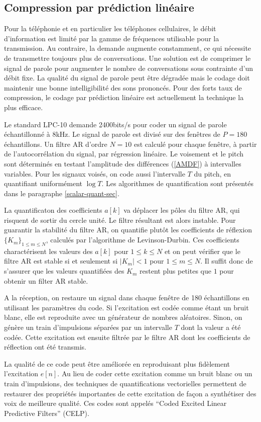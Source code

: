 \subsection{Compression par pr\'ediction lin\'eaire}
\label{compre-LPC}

Pour la t\'el\'ephonie et en particulier les t\'el\'ephones cellulaires,
le d\'ebit d'information est limit\'e par la gamme de fr\'equences
utilisable pour la transmission. Au contraire, la demande augmente
constamment, ce qui n\'ecessite de transmettre toujours plus
de conversations. Une solution est de comprimer le signal de parole
pour augmenter le nombre de conversations sous contrainte
d'un d\'ebit fixe.
La qualit\'e du signal de parole peut \^etre
d\'egrad\'ee mais le codage doit maintenir une bonne intelligibilit\'e
des sons prononc\'es.
Pour des forts taux de compression,
le codage par pr\'ediction lin\'eaire est actuellement la
technique la plus efficace.

Le standard LPC-10 demande 2400bits/s pour coder un
signal de parole \'echantillonn\'e \`a 8kHz. Le signal de parole est
divis\'e sur des fen\^etres de $P = 180$ \'echantillons.
Un filtre AR d'ordre $N=10$ est calcul\'e pour chaque fen\^etre, \`a partir de l'autocorr\'elation du signal, par r\'egression
lin\'eaire. Le voisement et le
pitch sont d\'etermin\'es en
testant l'amplitude des diff\'erences (\ref{AMDF}) \`a intervalles
variables.
Pour les signaux vois\'es, on code aussi l'intervalle $T$ du
pitch, en quantifiant uniform\'ement $\log T$.
Les algorithmes de quantification sont pr\'esent\'es
dans le paragraphe \ref{scalar-quant-sec}.

La quantificaton des coefficients $a[k]$ va d\'eplacer
les p\^oles du filtre AR, qui risquent de sortir du cercle
unit\'e. Le filtre r\'esultant est alors instable.
Pour guarantir la stabilit\'e du filtre AR, on quantifie
plut\^ot les coefficients de r\'eflexion
$\{K_m\}_{1 \leq m \leq N}$,
calcul\'es par l'algorithme de Levinson-Durbin.
Ces coefficients charact\'erisent les valeurs des $a[k]$
pour $1 \leq k \leq N$ et on peut v\'erifier que le
filtre AR est stable si et seulement si $|K_m| < 1$
pour ${1 \leq m \leq N}$. Il suffit donc de s'assurer que les
valeurs quantifi\'ees des $K_m$ restent plus petites que $1$
pour obtenir un filter AR stable.

A la r\'eception, on restaure un signal
dans chaque fen\^etre de 180 \'echantillons en utilisant les param\`etres
du code. Si l'excitation est cod\'ee comme \'etant un bruit blanc,
elle est reproduite avec un
g\'en\'erateur de nombres al\'eatoires. Sinon, on g\'en\`ere
un train d'impulsions
s\'epar\'ees par un intervalle $T$ dont la valeur a \'et\'e cod\'ee.
Cette excitation est ensuite filtr\'ee par le filtre AR
dont les coefficients de r\'eflection ont \'et\'e transmis.

La qualit\'e de ce code peut \^etre am\'elior\'ee en reproduisant
plus fid\`element l'excitation $e[n]$. Au lieu de coder cette
excitation comme un bruit blanc ou un train d'impulsions,
des techniques de quantifications vectorielles
permettent de restaurer des propri\'et\'es importantes de cette
excitation de fa\c{c}on a synth\'etiser des voix de meilleure  qualit\'e.
Ces codes sont appel\'es ``Coded Excited Linear Predictive Filters''
(CELP).
